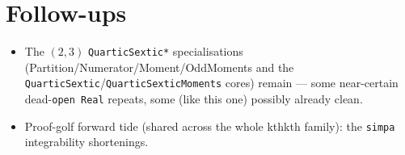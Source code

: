 \documentclass[11pt]{article}
\begin{document}
\section{Follow-ups}
\begin{itemize}[noitemsep]
  \item The $(2,3)$ \texttt{QuarticSextic*} specialisations (Partition/Numerator/Moment/OddMoments
    and the \texttt{QuarticSextic}/\texttt{QuarticSexticMoments} cores) remain --- some near-certain
    dead-\texttt{open Real} repeats, some (like this one) possibly already clean.
  \item Proof-golf forward tide (shared across the whole kthkth family): the \texttt{simpa}
    integrability shortenings.
\end{itemize}
\end{document}
